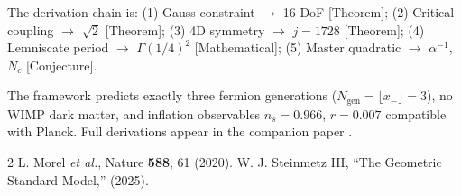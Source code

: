 \documentclass[aps,prl,twocolumn,10pt,groupedaddress,nopacs]{revtex4}
\begin{document}
The derivation chain is: (1) Gauss constraint $\to$ 16 DoF [Theorem]; (2) Critical coupling $\to$ $\sqrt{2}$ [Theorem]; (3) 4D symmetry $\to$ $j=1728$ [Theorem]; (4) Lemniscate period $\to$ $\Gamma(1/4)^2$ [Mathematical]; (5) Master quadratic $\to$ $\alpha^{-1}$, $N_c$ [Conjecture].

The framework predicts exactly three fermion generations ($N_{\text{gen}} = \lfloor x_- \rfloor = 3$), no WIMP dark matter, and inflation observables $n_s = 0.966$, $r = 0.007$ compatible with Planck. Full derivations appear in the companion paper \cite{GSM2025}.

\begin{thebibliography}{2}
 L. Morel \textit{et al.}, Nature \textbf{588}, 61 (2020).
 W. J. Steinmetz III, ``The Geometric Standard Model,'' (2025).
\end{thebibliography}
\end{document}
